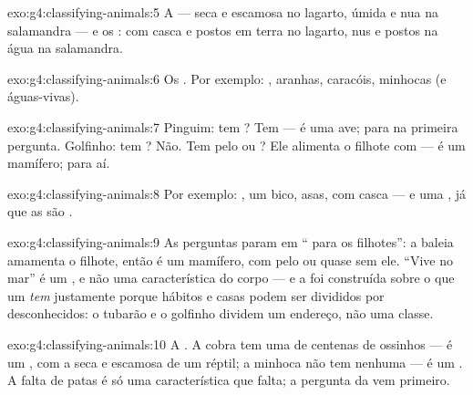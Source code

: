 \begin{solution}{exo:g4:classifying-animals:5}
A  --- seca e escamosa no lagarto, úmida e nua na salamandra ---
e os : com casca e postos em terra no lagarto, nus e postos na
água na salamandra.
\end{solution}

\begin{solution}{exo:g4:classifying-animals:6}
Os . Por exemplo: , aranhas, caracóis, minhocas
(e águas-vivas).
\end{solution}

\begin{solution}{exo:g4:classifying-animals:7}
Pinguim: tem ? Tem --- é uma ave; para na primeira pergunta.
Golfinho: tem ? Não. Tem pelo ou ? Ele alimenta o filhote
com  --- é um mamífero; para aí.
\end{solution}

\begin{solution}{exo:g4:classifying-animals:8}
Por exemplo: , um bico, asas,  com casca --- e uma , já que as  são .
\end{solution}

\begin{solution}{exo:g4:classifying-animals:9}
As perguntas param em `` para os filhotes'': a baleia amamenta
o filhote, então é um mamífero, com pelo ou quase sem ele. ``Vive no
mar'' é um , e não uma característica do corpo --- e a
 foi construída sobre o que um  \emph{tem}
justamente porque hábitos e casas podem ser divididos por
desconhecidos: o tubarão e o golfinho dividem um endereço, não uma
classe.
\end{solution}

\begin{solution}{exo:g4:classifying-animals:10}
A . A cobra tem uma  de centenas de ossinhos
--- é um , com a  seca e escamosa de um réptil; a
minhoca não tem  nenhuma --- é um . A
falta de patas é só uma característica que falta; a pergunta da
 vem primeiro.
\end{solution}

